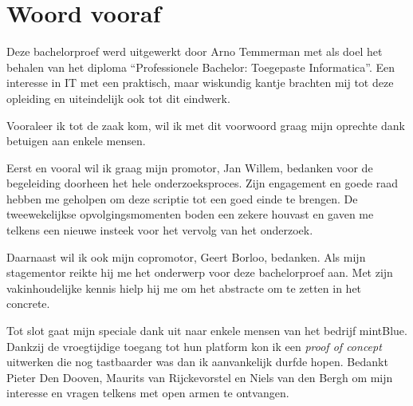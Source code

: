 
\chapter*{Woord vooraf}
\label{ch:voorwoord}

Deze bachelorproef werd uitgewerkt door Arno Temmerman met als doel het behalen van het diploma ``Professionele Bachelor: Toegepaste Informatica''. Een interesse in IT met een praktisch, maar wiskundig kantje brachten mij tot deze opleiding en uiteindelijk ook tot dit eindwerk.

Vooraleer ik tot de zaak kom, wil ik met dit voorwoord graag mijn oprechte dank betuigen aan enkele mensen.

Eerst en vooral wil ik graag mijn promotor, Jan Willem, bedanken voor de begeleiding doorheen het hele onderzoeksproces. Zijn engagement en goede raad hebben me geholpen om deze scriptie tot een goed einde te brengen. De tweewekelijkse opvolgingsmomenten boden een zekere houvast en gaven me telkens een nieuwe insteek voor het vervolg van het onderzoek.

Daarnaast wil ik ook mijn copromotor, Geert Borloo, bedanken. Als mijn stagementor reikte hij me het onderwerp voor deze bachelorproef aan. Met zijn vakinhoudelijke kennis hielp hij me om het abstracte om te zetten in het concrete.

Tot slot gaat mijn speciale dank uit naar enkele mensen van het bedrijf mintBlue. Dankzij de vroegtijdige toegang tot hun platform kon ik een \textit{proof of concept} uitwerken die nog tastbaarder was dan ik aanvankelijk durfde hopen. Bedankt Pieter Den Dooven, \mbox{Maurits} van Rijckevorstel en Niels van den Bergh om mijn interesse en vragen telkens met open armen te ontvangen.